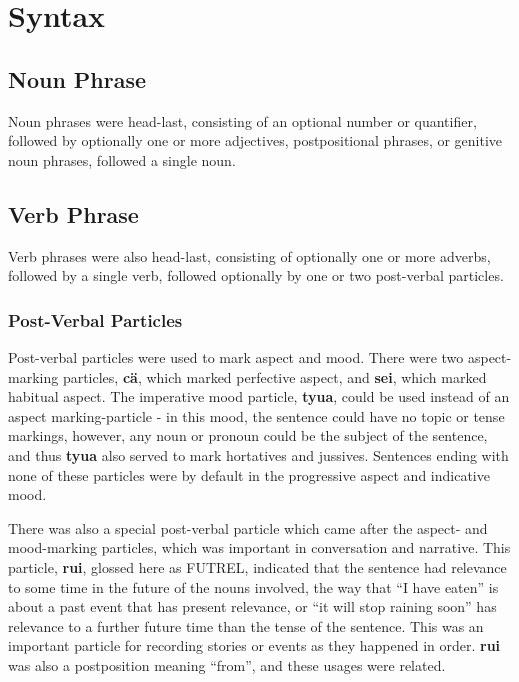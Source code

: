 \documentclass{article}
\begin{document}
\section{Syntax}
\subsection{Noun Phrase}

Noun phrases were head-last, consisting of an optional number or quantifier, followed by optionally one or more adjectives, postpositional phrases, or genitive noun phrases, followed a single noun.  

\subsection{Verb Phrase}

Verb phrases were also head-last, consisting of optionally one or more adverbs, followed by a single verb, followed optionally by one or two post-verbal particles.

\subsubsection{Post-Verbal Particles}

Post-verbal particles were used to mark aspect and mood.  There were two aspect-marking particles, \textbf{c\"a}, which marked perfective aspect, and \textbf{sei}, which marked habitual aspect.  The imperative mood particle, \textbf{tyua}, could be used instead of an aspect marking-particle - in this mood, the sentence could have no topic or tense markings, however, any noun or pronoun could be the subject of the sentence, and thus \textbf{tyua} also served to mark hortatives and jussives.  Sentences ending with none of these particles were by default in the progressive aspect and indicative mood.

There was also a special post-verbal particle which came after the aspect- and mood-marking particles, which was important in conversation and narrative.  This particle, \textbf{rui}, glossed here as \textsc{FUTREL}, indicated that the sentence had relevance to some time in the future of the nouns involved, the way that ``I have eaten'' is about a past event that has present relevance, or ``it will stop raining soon'' has relevance to a further future time than the tense of the sentence.  This was an important particle for recording stories or events as they happened in order.  \textbf{rui} was also a postposition meaning ``from'', and these usages were related.
\end{document}

